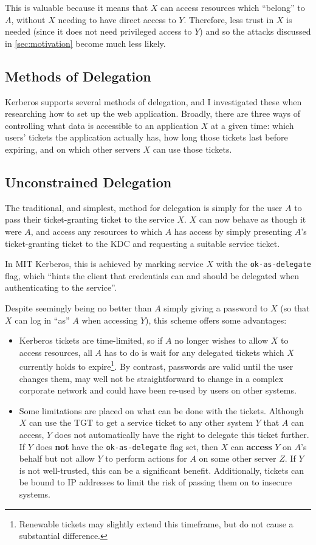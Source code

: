\documentclass[12pt]{report}
\begin{document}
This is valuable because it means that $X$ can access resources which ``belong'' to $A$, without $X$ needing to have direct access to $Y$. Therefore, less trust in $X$ is needed (since it does not need privileged access to $Y$) and so the attacks discussed in \autoref{sec:motivation} become much less likely.

\subsection{Methods of Delegation}
Kerberos supports several methods of delegation, and I investigated these when researching how to set up the web application. Broadly, there are three ways of controlling what data is accessible to an application $X$ at a given time: which users' tickets the application actually has, how long those tickets last before expiring, and on which other servers $X$ can use those tickets.

\subsection{Unconstrained Delegation}
The traditional, and simplest, method for delegation is simply for the user $A$ to pass their ticket-granting ticket to the service $X$. $X$ can now behave as though it were $A$, and access any resources to which $A$ has access by simply presenting $A$'s ticket-granting ticket to the KDC and requesting a suitable service ticket\cite{JohnKol-unconstrained-deleg}.

In MIT Kerberos, this is achieved by marking service $X$ with the \verb+ok-as-delegate+ flag, which ``hints the client that credentials can and should be delegated when authenticating to the service''\cite{KDC-conf-docs}.

Despite seemingly being no better than $A$ simply giving a password to $X$ (so that $X$ can log in ``as'' $A$ when accessing $Y$), this scheme offers some advantages:

\begin{itemize}
\item
  Kerberos tickets are time-limited, so if $A$ no longer wishes to allow $X$ to access resources, all $A$ has to do is wait for any delegated tickets which $X$ currently holds to expire\footnote{Renewable tickets may slightly extend this timeframe, but do not cause a substantial difference.}. By contrast, passwords are valid until the user changes them, may well not be straightforward to change in a complex corporate network and could have been re-used by users on other systems.
\item
  Some limitations are placed on what can be done with the tickets. Although $X$ can use the TGT to get a service ticket to any other system $Y$ that $A$ can access, $Y$ does not automatically have the right to delegate this ticket further. If $Y$ does \textbf{not} have the \verb+ok-as-delegate+ flag set, then $X$ can \textbf{access} $Y$ on $A$'s behalf but not allow $Y$ to perform actions for $A$ on some other server $Z$. If $Y$ is not well-trusted, this can be a significant benefit. Additionally, tickets can be bound to IP addresses to limit the risk of passing them on to insecure systems.
\end{itemize}
\end{document}
